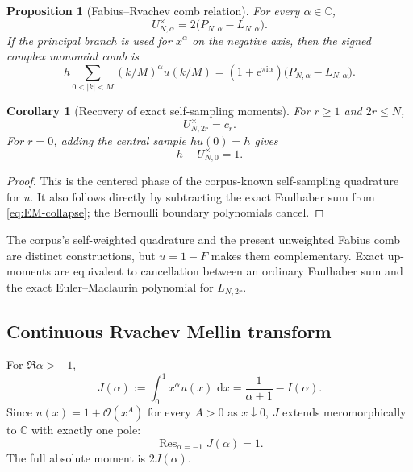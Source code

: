 \documentclass[11pt,oneside]{article}
\numberwithin{equation}{section}
\newtheorem{proposition}[theorem]{Proposition}
\newtheorem{corollary}[theorem]{Corollary}
\theoremstyle{definition}
\theoremstyle{remark}
\newcommand{\C}{\mathbb C}
\newcommand{\dd}{\,\mathrm d}
\newcommand{\e}{\mathrm e}
\newcommand{\ii}{\mathrm i}
\newcommand{\bigO}{\mathcal O}
\DeclareMathOperator{\Res}{Res}
\begin{document}
\begin{proposition}[Fabius--Rvachev comb relation]
\label{prop:U-F}
For every \(\alpha\in\C\),
\begin{equation}
 \boxed{\displaystyle
 U_{N,\alpha}^{\times}=2\bigl(P_{N,\alpha}-L_{N,\alpha}\bigr).}
 \label{eq:U-relation}
\end{equation}
If the principal branch is used for \(x^\alpha\) on the negative axis, then the signed
complex monomial comb is
\begin{equation}
 h\sum_{0<|k|<M}(k/M)^\alpha u(k/M)
 =(1+\e^{\pi\ii\alpha})\bigl(P_{N,\alpha}-L_{N,\alpha}\bigr).
 \label{eq:U-branch}
\end{equation}
\end{proposition}

\begin{corollary}[Recovery of exact self-sampling moments]
\label{cor:recover-self-sampling}
For \(r\ge1\) and \(2r\le N\),
\begin{equation}
 U_{N,2r}^{\times}=c_r.
 \label{eq:U-even-exact}
\end{equation}
For \(r=0\), adding the central sample \(hu(0)=h\) gives
\begin{equation}
 h+U_{N,0}^{\times}=1.
 \label{eq:U-normalization}
\end{equation}
\end{corollary}

\begin{proof}
This is the centered phase of the corpus-known self-sampling quadrature for \(u\).  It
also follows directly by subtracting the exact Faulhaber sum from
\eqref{eq:EM-collapse}; the Bernoulli boundary polynomials cancel.
\end{proof}

\begin{resultbox}
The corpus's self-weighted quadrature and the present unweighted Fabius comb are distinct
constructions, but \(u=1-F\) makes them complementary.  Exact up-moments are equivalent
to cancellation between an ordinary Faulhaber sum and the exact Euler--Maclaurin
polynomial for \(L_{N,2r}\).
\end{resultbox}

\subsection{Continuous Rvachev Mellin transform}

For \(\Re\alpha>-1\),
\begin{equation}
 J(\alpha):=\int_0^1x^\alpha u(x)\,\dd x
 =\frac1{\alpha+1}-I(\alpha).
 \label{eq:Jalpha}
\end{equation}
Since \(u(x)=1+\bigO(x^A)\) for every \(A>0\) as \(x\downarrow0\), \(J\) extends
meromorphically to \(\C\) with exactly one pole:
\begin{equation}
 \Res_{\alpha=-1}J(\alpha)=1.
 \label{eq:J-residue}
\end{equation}
The full absolute moment is \(2J(\alpha)\).
\end{document}
